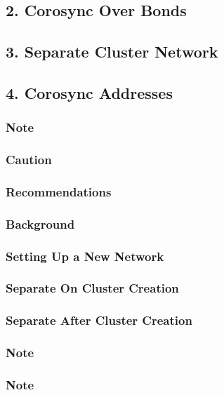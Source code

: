 \subsection{2. Corosync Over Bonds}

\subsection{3. Separate Cluster Network}

\subsection{4. Corosync Addresses}

\subsubsection{Note}

\subsubsection{Caution}

\subsubsection{Recommendations}

\subsubsection{Background}

\subsubsection{Setting Up a New Network}

\subsubsection{Separate On Cluster Creation}

\subsubsection{Separate After Cluster Creation}

\subsubsection{Note}

\subsubsection{Note}

